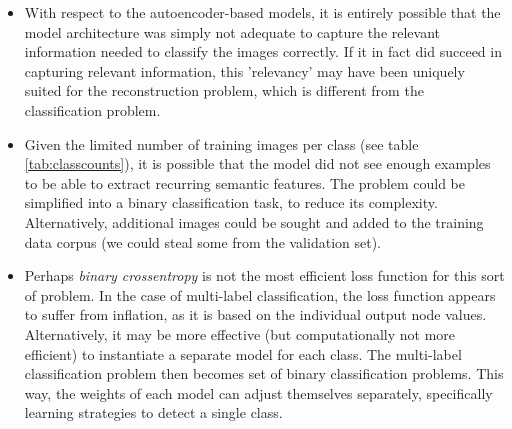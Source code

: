 \begin{itemize}

	\item{With respect to the autoencoder-based models, it is entirely possible that the model architecture was simply not adequate to capture the relevant information needed to classify the images correctly. If it in fact did succeed in capturing relevant information, this 'relevancy' may have been uniquely suited for the reconstruction problem, which is different from the classification problem.}
	
	\item{Given the limited number of training images per class (see table \ref{tab:classcounts}), it is possible that the model did not see enough examples to be able to extract recurring semantic features. The problem could be simplified into a binary classification task, to reduce its complexity. Alternatively, additional images could be sought and added to the training data corpus (we could steal some from the validation set).}
	
	\item{Perhaps \textit{binary crossentropy} is not the most efficient loss function for this sort of problem. In the case of multi-label classification, the loss function appears to suffer from inflation, as it is based on the individual output node values. Alternatively, it may be more effective (but computationally not more efficient) to instantiate a separate model for each class. The multi-label classification problem then becomes set of binary classification problems. This way, the weights of each model can adjust themselves separately, specifically learning strategies to detect a single class.}

\end{itemize}
